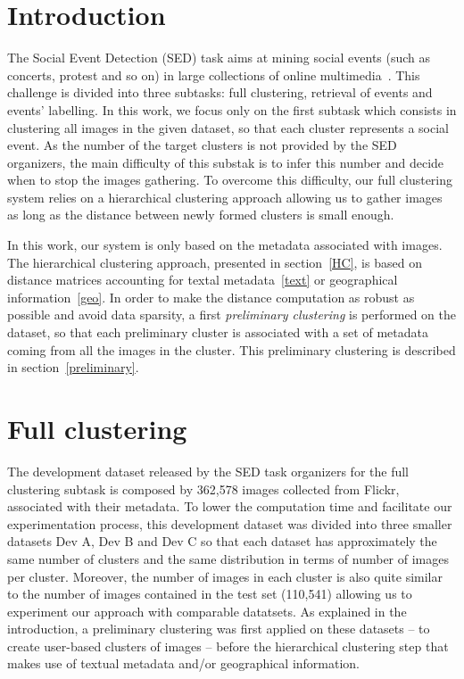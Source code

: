 \documentclass{acm_proc_article-me11_tweaked}
\begin{document}
\section{Introduction}
The Social Event Detection (SED) task aims at mining social events (such as concerts, protest and so on) in large collections of online multimedia~\cite{PPM+14}. This challenge is divided into three subtasks: full clustering, retrieval of events and events' labelling. 
In this work, we focus only on the first subtask which consists in clustering all images in the given dataset, so that each cluster represents a social event. 
As the number of the target clusters is not provided by the SED organizers, the main difficulty of this substak is to infer this number and decide when to stop the images gathering.
To overcome this difficulty, our full clustering system relies on a hierarchical clustering approach allowing us to gather images as long as the distance between newly formed clusters is small enough.

In this work, our system is only based on the metadata associated with images. The hierarchical clustering approach, presented in section~\ref{HC}, is based on distance matrices accounting for textal metadata~\ref{text} or geographical information~\ref{geo}. In order to make the distance computation as robust as possible and avoid data sparsity, a first \textit{preliminary clustering} is performed on the dataset, so that each preliminary cluster is associated with a set of metadata coming from all the images in the cluster. This preliminary clustering is described in section~\ref{preliminary}.

\section{Full clustering}

The development dataset released by the SED task organizers for the full clustering subtask is composed by 362,578 images collected from Flickr, associated with their metadata.  
To lower the computation time and facilitate our experimentation process, this development dataset was divided into three smaller datasets Dev A, Dev B and Dev C so that each dataset has approximately the same number of clusters and the same distribution in terms of number of images per cluster. Moreover, the number of images in each cluster is also quite similar to the number of images contained in the test set (110,541) allowing us to experiment our approach with comparable datatsets. 
As explained in the introduction, a preliminary clustering was first applied on these datasets -- to create user-based clusters of images -- before the hierarchical clustering step that makes use of textual metadata and/or geographical information.
\end{document}
